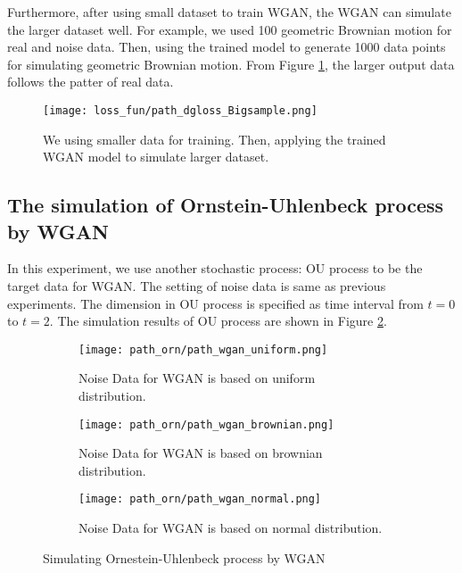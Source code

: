 \documentclass{article}
\begin{document}
	Furthermore, after using small dataset to train WGAN, the WGAN can simulate the larger dataset well.
	For example, we used 100 geometric Brownian motion for real and noise data. Then, using the trained model to generate 1000 data points for simulating geometric Brownian motion.
	From Figure \ref{fig:path_dgloss_Bigsample}, the larger output data follows the patter of real data.
	
	
	\begin{figure}[h]
		\centering
		\texttt{[image: loss\_fun/path\_dgloss\_Bigsample.png]}
		\caption{We using smaller data for training. Then, applying the trained WGAN model to simulate larger dataset.}
		\label{fig:path_dgloss_Bigsample}
	\end{figure}

	
	
	
	

	
	

	\subsection{The simulation of Ornstein-Uhlenbeck process by WGAN}
	
	In this experiment, we use another stochastic process: OU process to be the target data for WGAN.
	The setting of noise data is same as previous experiments.
	The dimension in OU process is specified as time interval from $t=0$ to $t=2$. 
	The simulation results of OU process are shown in Figure \ref{fig:path_wgan_ou}. 
	
	
	\begin{figure}[h]
		\centering
		\begin{subfigure}[b]{0.6\textwidth}
			\texttt{[image: path\_orn/path\_wgan\_uniform.png]}
			\caption{Noise Data for WGAN is based on uniform distribution.}
		\end{subfigure}
		\begin{subfigure}[b]{0.6\textwidth}
			\texttt{[image: path\_orn/path\_wgan\_brownian.png]}
			\caption{Noise Data for WGAN is based on brownian distribution.}
		\end{subfigure}
		\begin{subfigure}[b]{0.6\textwidth}
			\texttt{[image: path\_orn/path\_wgan\_normal.png]}
			\caption{Noise Data for WGAN is based on normal distribution.}
		\end{subfigure}
		\caption{Simulating Ornestein-Uhlenbeck process by WGAN}
		\label{fig:path_wgan_ou}
	\end{figure}
	
\end{document}

